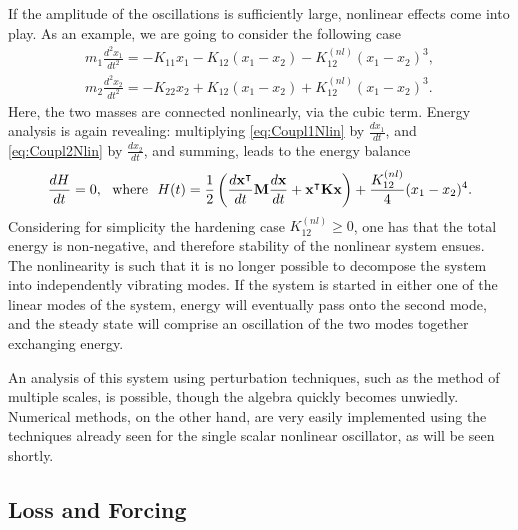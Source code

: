 \documentclass[11pt,twoside,a4paper,english]{book}
\begin{document}
If the amplitude of the oscillations is sufficiently large, nonlinear effects come into play. As an example, we are going to consider the following case
\begin{subequations}\label{eq:TwoMass1Nlin}
\begin{align}
m_1 \frac{d^2 x_1}{dt^2} = -K_{11}x_1 - K_{12}(x_1 - x_2) - K^{(nl)}_{12}(x_1 - x_2)^3, \label{eq:Coupl1Nlin} \\
m_2 \frac{d^2 x_2}{dt^2} = -K_{22}x_2 + K_{12}(x_1 - x_2) + K^{(nl)}_{12}(x_1 - x_2)^3. \label{eq:Coupl2Nlin}
\end{align}
\end{subequations}
Here, the two masses are connected nonlinearly, via the cubic term. Energy analysis is again revealing: multiplying \eqref{eq:Coupl1Nlin} by $\frac{d x_1}{dt}$, and \eqref{eq:Coupl2Nlin} by $\frac{d x_2}{dt}$, and summing, leads to the energy balance
\begin{equation}
\frac{dH}{dt} = 0, \,\, \text{ where } \,\, H(t) = \frac{1}{2}\left(\frac{d{\bf x}^\intercal}{dt} {\bf M} \frac{d{\bf x}}{dt} + {\bf x}^\intercal {\bf K} {\bf x}\right) + \frac{K^{(nl)}_{12}}{4}(x_1-x_2)^4.
\end{equation}
Considering for simplicity the hardening case $K^{(nl)}_{12} \geq 0$, one has that the total energy is non-negative, and therefore stability of the nonlinear system ensues. The nonlinearity is such that it is no longer possible to decompose the system into independently vibrating modes. If the system is started in either one of the linear modes of the system, energy will eventually pass onto the second mode, and the steady state will comprise an oscillation of the two modes together exchanging energy.


An analysis of this system using perturbation techniques, such as the method of multiple scales, is possible, though the algebra quickly becomes unwiedly. Numerical methods, on the other hand, are very easily implemented using the techniques already seen for the single scalar nonlinear oscillator,  as will be seen shortly. 


\subsection{Loss and Forcing}
\end{document}
